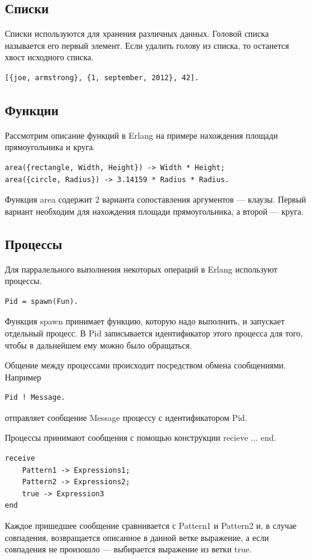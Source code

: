 		\subsection{Списки} 
			Списки используются для хранения различных данных. Головой списка называется его первый элемент. Если удалить 
			голову из списка, то останется хвост исходного списка.
			\begin{lstlisting}
[{joe, armstrong}, {1, september, 2012}, 42].
			\end{lstlisting}

		\subsection{Функции}
			Рассмотрим описание функций в Erlang на примере нахождения площади прямоугольника и круга.
			\begin{lstlisting}
area({rectangle, Width, Height}) -> Width * Height;
area({circle, Radius}) -> 3.14159 * Radius * Radius.
			\end{lstlisting}
			Функция area содержит 2 варианта сопоставления аргументов --- клаузы. Первый вариант необходим для нахождения 
			площади прямоугольника, а второй --- круга. 	
			
		\subsection{Процессы}
			Для парралельного выполнения некоторых операций в Erlang используют процессы.
			\begin{lstlisting}
Pid = spawn(Fun).
			\end{lstlisting}
			Функция spawn принимает функцию, которую надо выполнить, и запускает отдельный процесс. В Pid записывается идентификатор
			этого процесса для того, чтобы в дальнейшем ему можно было обращаться.
			
			Общение между процессами происходит посредством обмена сообщениями. Например
			\begin{lstlisting}
Pid ! Message.
			\end{lstlisting}
			отправляет сообщение Message процессу с идентификатором Pid.

			Процессы принимают сообщения с помощью конструкции recieve ... end. 
			\begin{lstlisting}
receive
	Pattern1 -> Expressions1;
	Pattern2 -> Expressions2;
	true -> Expression3
end
			\end{lstlisting}
			Каждое пришедшее сообщение сравнивается с Pattern1 и Pattern2 и, в случае совпадения, возвращается описанное в данной 
			ветке выражение, а если совпадения не произошло --- выбирается выражение из ветки true. 
	

